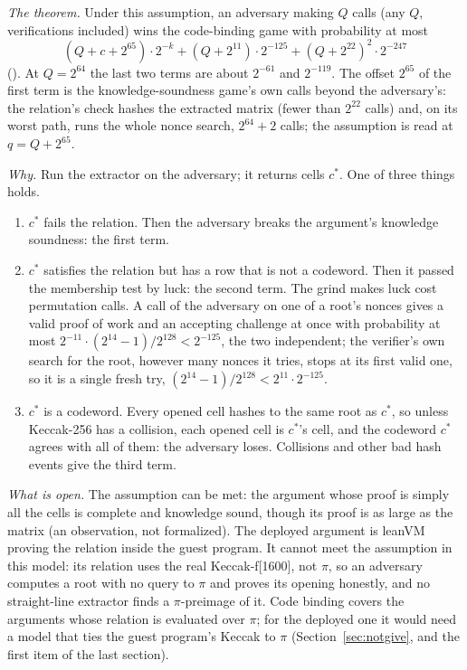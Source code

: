 \documentclass[11pt]{article}
\begin{document}
\emph{The theorem.} Under this assumption, an adversary making $Q$ calls (any $Q$, verifications
included) wins the code-binding game with probability at most
\[
\boxed{\ (Q + c + 2^{65})\cdot 2^{-k} + (Q + 2^{11})\cdot 2^{-125} + (Q + 2^{22})^2\cdot 2^{-247}\ }
\]
(). At $Q = 2^{64}$ the last two terms are about
$2^{-61}$ and $2^{-119}$. The offset $2^{65}$ of the first term is the knowledge-soundness game's
own calls beyond the adversary's: the relation's check hashes the extracted matrix (fewer than
$2^{22}$ calls) and, on its worst path, runs the whole nonce search, $2^{64} + 2$ calls; the
assumption is read at $q = Q + 2^{65}$.

\emph{Why.} Run the extractor on the adversary; it returns cells $c^*$. One of three things holds.
\begin{enumerate}
\item $c^*$ fails the relation. Then the adversary breaks the argument's knowledge soundness:
the first term.
\item $c^*$ satisfies the relation but has a row that is not a codeword. Then it passed the
membership test by luck: the second term. The grind makes luck cost permutation calls. A call of
the adversary on one of a root's nonces gives a valid proof of work and an accepting challenge at
once with probability at most $2^{-11}\cdot(2^{14}-1)/2^{128} < 2^{-125}$, the two independent;
the verifier's own search for the root, however many nonces it tries, stops at its first valid
one, so it is a single fresh try, $(2^{14}-1)/2^{128} < 2^{11}\cdot 2^{-125}$.
\item $c^*$ is a codeword. Every opened cell hashes to the same root as $c^*$, so unless Keccak-256
has a collision, each opened cell is $c^*$'s cell, and the codeword $c^*$ agrees with all of them:
the adversary loses. Collisions and other bad hash events give the third term.
\end{enumerate}

\emph{What is open.} The assumption can be met: the argument whose proof is simply all the cells
is complete and knowledge sound, though its proof is as large as the matrix (an observation, not
formalized). The deployed argument is leanVM proving the relation inside the guest program. It cannot
meet the assumption in this model: its relation uses the real Keccak-f[1600], not $\pi$, so an
adversary computes a root with no query to $\pi$ and proves its opening honestly, and no
straight-line extractor finds a $\pi$-preimage of it. Code binding covers the arguments whose
relation is evaluated over $\pi$; for the deployed one it would need a model that ties the guest
program's Keccak to $\pi$ (Section~\ref{sec:notgive}, and the first item of the last section).
\end{document}

